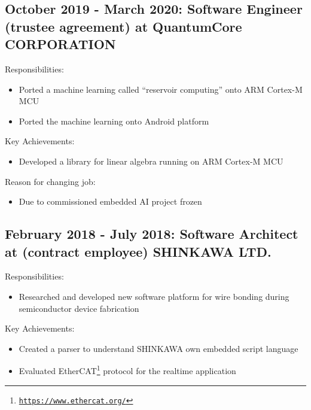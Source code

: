 \documentclass[letterpaper]{article}
\begin{document}
\subsection*{October 2019 - March 2020: Software Engineer (trustee agreement) at QuantumCore CORPORATION}

\noindent Responsibilities:

\begin{itemize}
  \item Ported a machine learning called ``reservoir computing'' onto ARM Cortex-M MCU
  \item Ported the machine learning onto Android platform
\end{itemize}

\noindent Key Achievements:

\begin{itemize}
  \item Developed a library for linear algebra running on ARM Cortex-M MCU
\end{itemize}

\noindent Reason for changing job:

\begin{itemize}
  \item Due to commissioned embedded AI project frozen
\end{itemize}

\subsection*{February 2018 - July 2018: Software Architect at (contract employee) SHINKAWA LTD.}

\noindent Responsibilities:

\begin{itemize}
  \item Researched and developed new software platform for wire bonding during semiconductor device fabrication
\end{itemize}

\noindent Key Achievements:

\begin{itemize}
  \item Created a parser to understand SHINKAWA own embedded script language
  \item Evaluated EtherCAT\footnote{\href{https://www.ethercat.org/}{\tt https://www.ethercat.org/}} protocol for the realtime application
\end{itemize}
\end{document}
